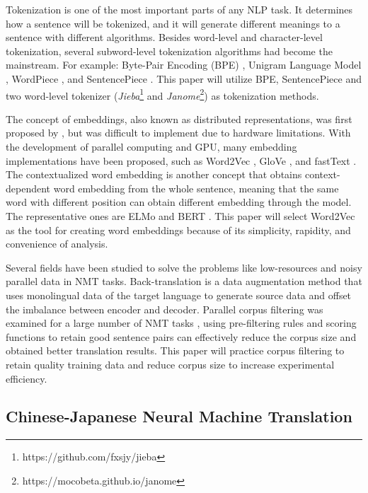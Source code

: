 Tokenization is one of the most important parts of any NLP task. It determines how a sentence will be tokenized, and it will generate different meanings to a sentence with different algorithms. Besides word-level and character-level tokenization, several subword-level tokenization algorithms had become the mainstream. For example: Byte-Pair Encoding (BPE) \cite{sennrich_neural_2016}, Unigram Language Model \cite{kudo-2018-subword}, WordPiece \cite{6289079}, and SentencePiece \cite{kudo-richardson-2018-sentencepiece}. This paper will utilize BPE, SentencePiece \cite{sennrich_neural_2016, kudo-richardson-2018-sentencepiece} and two word-level tokenizer (\textit{Jieba}\footnote{https://github.com/fxsjy/jieba} and \textit{Janome}\footnote{https://mocobeta.github.io/janome}) as tokenization methods.

The concept of embeddings, also known as distributed representations, was first proposed by \cite{hinton1986learning, bengio2003neural}, but was difficult to implement due to hardware limitations. With the development of parallel computing and GPU, many embedding implementations have been proposed, such as Word2Vec \cite{mikolov2013distributed}, GloVe \cite{pennington2014glove}, and fastText \cite{bojanowski2017enriching}. The contextualized word embedding is another concept that obtains context-dependent word embedding from the whole sentence, meaning that the same word with different position can obtain different embedding through the model. The representative ones are ELMo \cite{peters-etal-2018-deep} and BERT \cite{devlin-etal-2019-bert}. This paper will select Word2Vec \cite{mikolov2013distributed} as the tool for creating word embeddings because of its simplicity, rapidity, and convenience of analysis.

Several fields have been studied to solve the problems like low-resources and noisy parallel data in NMT tasks. Back-translation \cite{sennrich-etal-2016-improving} is a data augmentation method that uses monolingual data of the target language to generate source data and offset the imbalance between encoder and decoder. Parallel corpus filtering was examined for a large number of NMT tasks \cite{koehn2018findings}, using pre-filtering rules and scoring functions to retain good sentence pairs can effectively reduce the corpus size and obtained better translation results. This paper will practice corpus filtering to retain quality training data and reduce corpus size to increase experimental efficiency.

\subsection{Chinese-Japanese Neural Machine Translation}

